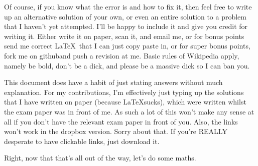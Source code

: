 \documentclass{article}
\begin{document}
Of course, if you know what the error is and how to fix it, then feel free to write up an alternative solution of your own, or even an entire solution to a problem that I haven't yet attempted. I'll be happy to include it and give you credit for writing it. Either write it on paper, scan it, and email me\footnotemark[1], or for bonus points send me correct \LaTeX\, that I can just copy paste in, or for super bonus points, fork me on github\footnotemark[4] and push a revision at me. Basic rules of Wikipedia apply, namely be bold, don't be a dick, and please be a massive dick so I can ban you.

This document does have a habit of just stating answers without much explanation. For my contributions, I'm effectively just typing up the solutions that I have written on paper (because \LaTeX sucks), which were written whilst the exam paper was in front of me. As such a lot of this won't make any sense at all if you don't have the relevant exam paper in front of you. Also, the links won't work in the dropbox version. Sorry about that. If you're REALLY desperate to have clickable links, just download it. 

Right, now that that's all out of the way, let's do some maths.

\clearpage
\end{document}
